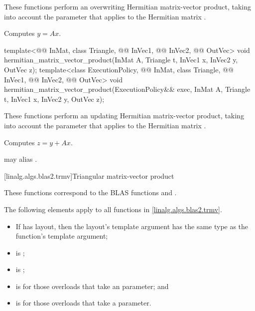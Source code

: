 \begin{itemdescr}
\pnum
These functions perform an overwriting Hermitian matrix-vector product,
taking into account the  parameter
that applies to the Hermitian matrix .

\pnum
\effects
Computes $y = A x$.
\end{itemdescr}

\begin{itemdecl}
template<@@ InMat, class Triangle, @@ InVec1, @@ InVec2, @@ OutVec>
  void hermitian_matrix_vector_product(InMat A, Triangle t, InVec1 x, InVec2 y, OutVec z);
template<class ExecutionPolicy,
         @@ InMat, class Triangle, @@ InVec1, @@ InVec2, @@ OutVec>
  void hermitian_matrix_vector_product(ExecutionPolicy&& exec,
                                       InMat A, Triangle t, InVec1 x, InVec2 y, OutVec z);
\end{itemdecl}

\begin{itemdescr}
\pnum
These functions perform an updating Hermitian matrix-vector product,
taking into account the  parameter
that applies to the Hermitian matrix .

\pnum
\effects
Computes $z = y + A x$.

\pnum
\remarks
{} may alias .
\end{itemdescr}

[linalg.algs.blas2.trmv]{Triangular matrix-vector product}

\pnum
\begin{note}
These functions correspond to the BLAS functions
 and .
\end{note}

\pnum
The following elements apply to all functions in \ref{linalg.algs.blas2.trmv}.

\pnum
\mandates
\begin{itemize}
\item
If  has  layout,
then the layout's  template argument has
the same type as the function's  template argument;
\item
{}
is ;
\item
{}
is ;
\item
{}
is  for those overloads that take an  parameter; and
\item
{}
is  for those overloads that take a  parameter.
\end{itemize}

